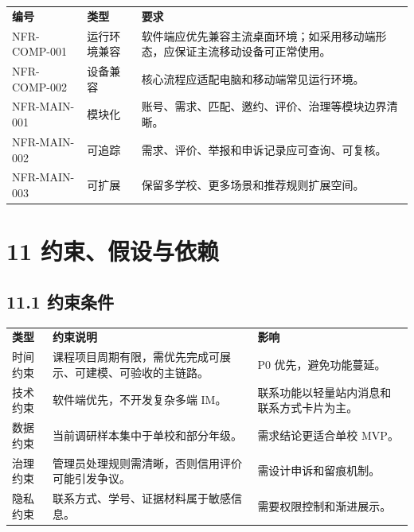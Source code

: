 {\def\LTcaptype{none} %
\begin{xltabular}{\textwidth}{@{}>{\centering\arraybackslash}X>{\centering\arraybackslash}X>{\centering\arraybackslash}X@{}}
\toprule\noalign{}
\endhead
\bottomrule\noalign{}
\endlastfoot
\textbf{编号} & \textbf{类型} & \textbf{要求} \\
NFR-COMP-001 & 运行环境兼容 &
软件端应优先兼容主流桌面环境；如采用移动端形态，应保证主流移动设备可正常使用。 \\
NFR-COMP-002 & 设备兼容 & 核心流程应适配电脑和移动端常见运行环境。 \\
NFR-MAIN-001 & 模块化 &
账号、需求、匹配、邀约、评价、治理等模块边界清晰。 \\
NFR-MAIN-002 & 可追踪 & 需求、评价、举报和申诉记录应可查询、可复核。 \\
NFR-MAIN-003 & 可扩展 & 保留多学校、更多场景和推荐规则扩展空间。 \\
\end{xltabular}
}

\chapter{11
约束、假设与依赖}\label{ux7ea6ux675fux5047ux8bbeux4e0eux4f9dux8d56}

\section{11.1 约束条件}\label{ux7ea6ux675fux6761ux4ef6}

{\def\LTcaptype{none} %
\begin{xltabular}{\textwidth}{@{}>{\centering\arraybackslash}X>{\centering\arraybackslash}X>{\centering\arraybackslash}X@{}}
\toprule\noalign{}
\endhead
\bottomrule\noalign{}
\endlastfoot
\textbf{类型} & \textbf{约束说明} & \textbf{影响} \\
时间约束 & 课程项目周期有限，需优先完成可展示、可建模、可验收的主链路。
& P0 优先，避免功能蔓延。 \\
技术约束 & 软件端优先，不开发复杂多端 IM。 &
联系功能以轻量站内消息和联系方式卡片为主。 \\
数据约束 & 当前调研样本集中于单校和部分年级。 & 需求结论更适合单校
MVP。 \\
治理约束 & 管理员处理规则需清晰，否则信用评价可能引发争议。 &
需设计申诉和留痕机制。 \\
隐私约束 & 联系方式、学号、证据材料属于敏感信息。 &
需要权限控制和渐进展示。 \\
\end{xltabular}
}

